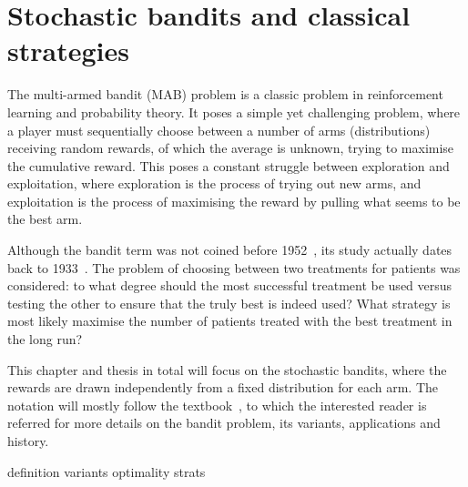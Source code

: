 \chapter{Stochastic bandits and classical strategies}
\label{chap:bandits}

The multi-armed bandit (MAB) problem is a classic problem in reinforcement learning and probability theory.
It poses a simple yet challenging problem, where a player must sequentially choose between a number of arms (distributions) receiving random rewards, of which the average is unknown, trying to maximise the cumulative reward.
This poses a constant struggle between exploration and exploitation, where exploration is the process of trying out new arms, and exploitation is the process of maximising the reward by pulling what seems to be the best arm.

Although the bandit term was not coined before 1952~\autocite{robbins1952}, its study actually dates back to 1933~\autocite{thompson1933}.
The problem of choosing between two treatments for patients was considered: to what degree should the most successful treatment be used versus testing the other to ensure that the truly best is indeed used?
What strategy is most likely maximise the number of patients treated with the best treatment in the long run?

This chapter and thesis in total will focus on the stochastic bandits, where the rewards are drawn independently from a fixed distribution for each arm.
The notation will mostly follow the textbook~\autocite{lattimore2020}, to which the interested reader is referred for more details on the bandit problem, its variants, applications and history.


{definition}
{variants}
{optimality}
{strats}
